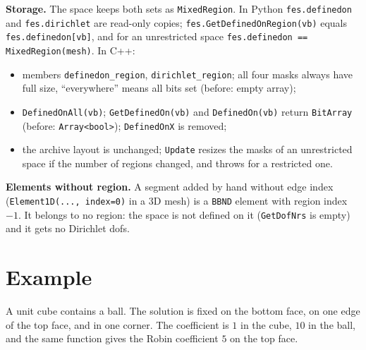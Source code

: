 \documentclass[10pt,a4paper]{article}
\newcommand{\code}[1]{\texttt{#1}}
\begin{document}
\textbf{Storage.} The space keeps both sets as \code{MixedRegion}. In Python \code{fes.definedon} and \code{fes.dirichlet} are read-only copies; \code{fes.GetDefinedOnRegion(vb)} equals \code{fes.definedon[vb]}, and for an unrestricted space \code{fes.definedon == \tld MixedRegion(mesh)}. In C++:
\begin{itemize}\setlength\itemsep{1pt}
\item members \code{definedon\_region}, \code{dirichlet\_region}; all four masks always have full size, ``everywhere'' means all bits set (before: empty array);
\item \code{DefinedOnAll(vb)}; \code{GetDefinedOn(vb)} and \code{DefinedOn(vb)} return \code{BitArray} (before: \code{Array<bool>}); \code{DefinedOnX} is removed;
\item the archive layout is unchanged; \code{Update} resizes the masks of an unrestricted space if the number of regions changed, and throws for a restricted one.
\end{itemize}

\textbf{Elements without region.} A segment added by hand without edge index (\code{Element1D(..., index=0)} in a 3D mesh) is a \code{BBND} element with region index $-1$. It belongs to no region: the space is not defined on it (\code{GetDofNrs} is empty) and it gets no Dirichlet dofs.

\section{Example}

A unit cube contains a ball. The solution is fixed on the bottom face, on one edge of the top face, and in one corner. The coefficient is $1$ in the cube, $10$ in the ball, and the same function gives the Robin coefficient $5$ on the top face.
\end{document}
